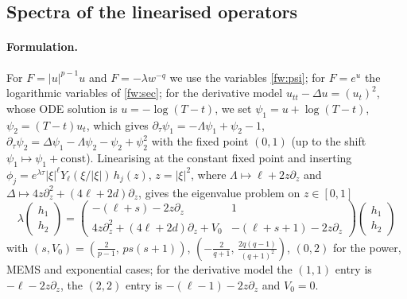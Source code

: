 \subsection{Spectra of the linearised operators}
\label{num:subsec-spec}

\paragraph{Formulation.}
For $F=|u|^{p-1}u$ and $F=-\lambda w^{-q}$ we use the variables
\eqref{fw:psi}; for $F=e^u$ the logarithmic variables of \cref{fw:sec}; for
the derivative model $u_{tt}-\Delta u=(u_t)^2$, whose ODE solution is
$u=-\log(T-t)$, we set $\psi_1=u+\log(T-t)$, $\psi_2=(T-t)u_t$, which gives
$\partial_\tau\psi_1=-\Lambda\psi_1+\psi_2-1$,
$\partial_\tau\psi_2=\Delta\psi_1-\Lambda\psi_2-\psi_2+\psi_2^2$ with the
fixed point $(0,1)$ (up to the shift $\psi_1\mapsto\psi_1+\text{const}$).
Linearising at the constant fixed point and inserting
$\phi_j=e^{\lambda\tau}|\xi|^\ell Y_\ell(\xi/|\xi|)\,h_j(z)$, $z=|\xi|^2$,
where $\Lambda\mapsto \ell+2z\partial_z$ and
$\Delta\mapsto 4z\partial_z^2+(4\ell+2d)\partial_z$, gives the
eigenvalue problem on $z\in[0,1]$
\begin{equation}\label{num:eig}
\lambda\begin{pmatrix}h_1\\h_2\end{pmatrix}=
\begin{pmatrix}-(\ell+s)-2z\partial_z & 1\\
4z\partial_z^2+(4\ell+2d)\partial_z+V_0 & -(\ell+s+1)-2z\partial_z\end{pmatrix}
\begin{pmatrix}h_1\\h_2\end{pmatrix}
\end{equation}
with $(s,V_0)=(\frac2{p-1},\,ps(s+1))$, $(-\frac2{q+1},\,\frac{2q(q-1)}{(q+1)^2})$,
$(0,2)$ for the power, MEMS and exponential cases; for the derivative
model the $(1,1)$ entry is $-\ell-2z\partial_z$, the $(2,2)$ entry is
$-(\ell-1)-2z\partial_z$ and $V_0=0$.

